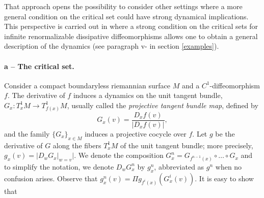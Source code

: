 \documentclass[a4paper,11pt]{article}
\theoremstyle{definition}
\begin{document}
That approach opens the possibility to consider other settings where a more general condition on the critical set could have strong dynamical implications. This perspective is  carried out in \cite{CLPY} where a strong condition on the critical sets for infinite renormalizable dissipative diffeomorphisms  allows one to obtain a general description of the dynamics (see paragraph v- in section \ref{examples}).


















\bigskip

\paragraph{a -- The critical set.}


Consider a compact boundaryless riemannian surface $M$ and a $C^1$-diffeomorphism $f$.
The derivative of $f$  induces a dynamics  on the unit tangent bundle,  $G_x\colon T^1_xM \to T^1_{f(x)}M$,  usually called the {\it projective tangent bundle map}, 
 defined by $$G_x(v)=
\frac{D_xf(v)}{|D_xf(v)|},$$ and the family $\{G_x\}_{x\in M}$ induces a projective cocycle over $f$.  Let  $g$ be the derivative of $G$ along the fibers
$T_x^1M$ of the unit tangent bundle; more precisely, 
$g_x(v)= |D_wG_x|_{w=v}|.$
We denote the composition $G^n_x= G_{f^{n-1}(x)}\circ\dots \circ G_{x}$ and
to simplify the notation, we denote $D_wG^n_x$ by  $g^n_x$, abbreviated as $g^n$ when no confusion arises. Observe that $g^n_x(v)= \Pi g_{f^i(x)}(G^i_x(v)).$ It is easy to show that 
\end{document}

